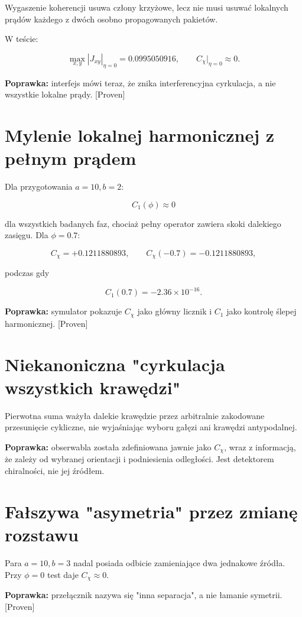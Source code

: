 \documentclass[11pt,a4paper,openany]{report}
\newcommand{\statusProven}{\textcolor{fingreen}{[Proven]}}
\begin{document}
Wygaszenie koherencji usuwa człony krzy\.zowe, lecz nie musi usuwać lokalnych prądów ka\.zdego z dwóch osobno propagowanych pakietów.

W teście:

\[
\max_{x,y}|J_{xy}|_{\eta=0}=0.0995050916,
\qquad
C_\chi|_{\eta=0}\approx0.
\]

\textbf{Poprawka:} interfejs mówi teraz, \.ze znika interferencyjna cyrkulacja, a nie wszystkie lokalne prądy. \statusProven{}

\section{Mylenie lokalnej harmonicznej z pełnym prądem}

Dla przygotowania \(a=10,b=2\):

\[
C_1(\phi)\approx0
\]

dla wszystkich badanych faz, chocia\.z pełny operator zawiera skoki dalekiego zasięgu. Dla \(\phi=0.7\):

\[
C_\chi=+0.1211880893,\qquad
C_\chi(-0.7)=-0.1211880893,
\]

podczas gdy

\[
C_1(0.7)=-2.36\times10^{-16}.
\]

\textbf{Poprawka:} symulator pokazuje \(C_\chi\) jako główny licznik i \(C_1\) jako kontrolę ślepej harmonicznej. \statusProven{}

\section{Niekanoniczna "cyrkulacja wszystkich krawędzi"}

Pierwotna suma wa\.zyła dalekie krawędzie przez arbitralnie zakodowane przesunięcie cykliczne, nie wyjaśniając wyboru gałęzi ani krawędzi antypodalnej.

\textbf{Poprawka:} obserwabla została zdefiniowana jawnie jako \(C_\chi\), wraz z informacją, \.ze zale\.zy od wybranej orientacji i podniesienia odległości. Jest detektorem chiralności, nie jej źródłem.

\section{Fałszywa "asymetria" przez zmianę rozstawu}

Para \(a=10,b=3\) nadal posiada odbicie zamieniające dwa jednakowe źródła. Przy \(\phi=0\) test daje \(C_\chi\approx0\).

\textbf{Poprawka:} przełącznik nazywa się "inna separacja", a nie łamanie symetrii. \statusProven{}
\end{document}
